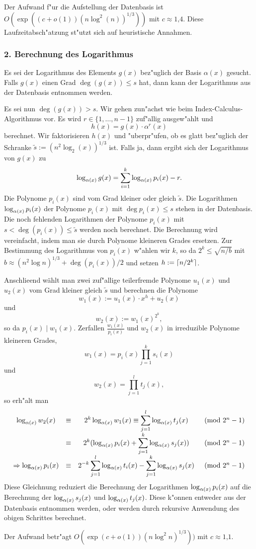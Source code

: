 Der Aufwand f"ur die Aufstellung der Datenbasis ist $O(\exp( (c+o(1))
(n\log^2(n))^{1/3} ))$ mit $c \approx \mbox{1,4}$. Diese Laufzeitabsch"atzung
st"utzt sich auf heuristische Annahmen.


\subsubsection*{2. Berechnung des Logarithmus}

Es sei der Logarithmus des Elements $g(x)$ bez"uglich der Basis
$\alpha(x)$ gesucht. Falls $g(x)$ einen Grad $\deg(g(x))\le s$ hat,
dann kann der Logarithmus aus der Datenbasis entnommen werden.

Es sei nun $\deg(g(x))>s$. Wir gehen zun"achst wie beim
Index-Calculus-Algorithmus vor. Es wird $r\in\{1,\ldots,n-1\}$
zuf"allig ausgew"ahlt und
$$ h(x) = g(x) \cdot \alpha^r(x) $$ 
berechnet. Wir faktorisieren $h(x)$ und "uberpr"ufen, ob es glatt
bez"uglich der Schranke $\tilde{s} := (n^2\log_2(x))^{1/3}$ ist. Falls
ja, dann ergibt sich der Logarithmus von $g(x)$ zu
$$ \log_{\alpha(x)} g(x) = \sum_{i=1}^{k}
   \log_{\alpha(x)}{p_i(x)}-r. 
$$ 
Die Polynome $p_i(x)$ sind vom Grad kleiner oder gleich $\tilde{s}$. Die
Logarithmen $\log_{\alpha(x)} p_i(x)$ der Polynome $p_i(x)$ mit
$\deg{p_i(x)}\le s$ stehen in der Datenbasis. Die noch fehlenden
Logarithmen der Polynome $p_i(x)$ mit $s < \deg(p_i(x)) \le \tilde{s}$
werden noch berechnet. Die Berechnung wird vereinfacht, indem man
sie durch Polynome kleineren Grades ersetzen. Zur Bestimmung des
Logarithmus von $p_i(x)$ w"ahlen wir $k$, so da\3 $2^k \le \sqrt{n/b}$
mit $b\approx (n^2\log n)^{1/3} + \deg(p_i(x))/2$ und setzen
$h:=\lceil n/2^k \rceil$.

Anschlie\3end w\"ahlt man zwei zuf"allige teilerfremde Polynome $u_1(x)$
und $u_2(x)$ vom Grad kleiner gleich $\tilde{s}$ und berechnen die
Polynome
$$ w_1(x) := u_1(x)\cdot x^h + u_2(x) $$
und
$$ w_2(x) := w_1(x)^{2^k}, $$
so da\3 $p_i(x) \mid w_1(x)$.
Zerfallen $\frac{w_1(x)}{p_i(x)}$ und $w_2(x)$ in irreduzible Polynome
kleineren Grades,
$$ w_1(x) = p_i(x) \prod_{j=1}^k s_i(x) $$
und
$$ w_2(x) = \prod_{j=1}^l t_j(x), $$
so erh"alt man
$$
\begin{array}{cccc}
   \displaystyle \log_{\alpha(x)} w_2(x)  
      & \equiv 
      & \displaystyle 2^k\log_{\alpha(x)} w_1(x) \equiv \sum_{j=1}^l \log_{\alpha(x)} t_j(x)
      & \pmod{2^n - 1} \\
   \displaystyle 
      & \equiv 
      & \displaystyle 2^k(\log_{\alpha(x)} p_i(x) + \sum_{j=1}^k \log_{\alpha(x)} s_j(x)) 
      & \pmod{2^n - 1} \\
   \displaystyle \Rightarrow  \log_{\alpha(x)} p_i(x) 
      & \equiv 
      & \displaystyle 2^{-k} \sum_{j=1}^l \log_{\alpha(x)} t_i(x) - \sum_{j=1}^k \log_{\alpha(x)} s_j(x) 
      & \pmod{2^n - 1}
\end{array}
$$
Diese Gleichnung reduziert die Berechnung der Logarithmen
$\log_{\alpha(x)} p_i(x)$ auf die Berechnung der
$\log_{\alpha(x)} s_j(x)$ und $\log_{\alpha(x)} t_j(x)$. Diese
k"onnen entweder aus der Datenbasis entnommen werden, oder werden
durch rekursive Anwendung des obigen Schrittes berechnet.

Der Aufwand betr"agt $O(\exp(c+o(1)) (n\log^2 n)^{1/3}))$ mit $c
\approx \mbox{1,1}$.
   


      
    
    
        
        
   
   

   
